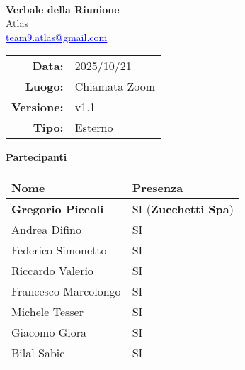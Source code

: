 \documentclass[a4paper,12pt]{article}
\makeatletter
\newcommand{\Gruppo}{Atlas}
\newcommand{\Email}{\href{mailto:team9.atlas@gmail.com}{\textcolor{blue}{\underline{team9.atlas@gmail.com}}}}
\newcommand{\TitoloVerbale}{Verbale della Riunione}
\newcommand{\DataVerbale}{2025/10/21}
\newcommand{\LuogoVerbale}{Chiamata Zoom}
\newcommand{\LogoGruppo}{img/AtlasLogo.png} %
\newcommand{\VersioneVerbale}{v1.1} %
\newcommand{\VerbaleEsterno}{Esterno}
\makeatother
\begin{document}
\begin{titlepage}
    \centering

    \vspace*{0cm}
    \\
    [.5cm]
    {\Huge \textbf{\TitoloVerbale}}\\[0.8cm]
    {\LARGE \Gruppo}\\[0.1cm]
    {\Email}\\[1.2cm]

    \begin{tabular}{rl}
        \textbf{Data:} & \DataVerbale \\
        \textbf{Luogo:} & \LuogoVerbale \\
        \textbf{Versione:} & \VersioneVerbale \\
        \textbf{Tipo:} & \VerbaleEsterno \\
    \end{tabular}

    \vspace{1.2cm}

    {\large \textbf{Partecipanti}}\\[0.5cm]
    \begin{tabular}{l|l}
        \textbf{Nome} & \textbf{Presenza} \\
        \hline
        \textbf{Gregorio Piccoli} & SI (\textbf{Zucchetti Spa})\\
        Andrea Difino & SI \\
        Federico Simonetto & SI \\
        Riccardo Valerio & SI \\
        Francesco Marcolongo & SI \\
        Michele Tesser & SI \\
        Giacomo Giora & SI \\
        Bilal Sabic & SI \\
    \end{tabular}

\end{titlepage}
\end{document}
